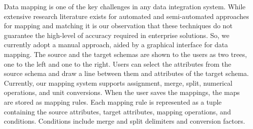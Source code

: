 Data mapping is one of the key challenges in any data integration system. While extensive research literature exists for automated and semi-automated approaches for mapping and matching \cite{mapping1,mapping2}
it is our observation that these techniques do not guarantee the high-level of accuracy required in enterprise solutions. So, we currently adopt a manual approach, aided by a graphical interface for data mapping. The source and 
the target schemas are shown to the users as two trees, one to the left and one to the right. Users can select the attributes from the source schema and draw a line between them and attributes of the target schema. Currently, our
mapping system supports assignment, merge, split, numerical operations, and unit conversions. When the user saves the mappings, the maps are stored as mapping rules. Each mapping rule is represented as a tuple containing the 
source attributes, target attributes, mapping operations, and conditions. Conditions include merge and split delimiters and conversion factors.  


